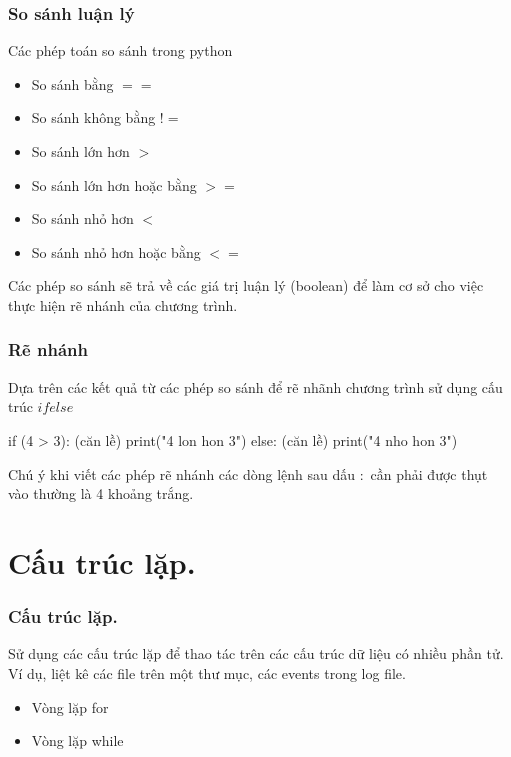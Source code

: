 \documentclass{beamer}
\begin{document}
\begin{frame}[label=sosanh]
\frametitle{So sánh luận lý}
Các phép toán so sánh trong python
\begin{itemize}
\item So sánh bằng $==$ 

\item So sánh không bằng $!=$
 
\item So sánh lớn hơn $>$

\item So sánh lớn hơn hoặc bằng $>=$

\item So sánh nhỏ hơn $<$

\item So sánh nhỏ hơn hoặc bằng $<=$
\end{itemize}

 Các phép so sánh sẽ trả về các giá trị luận lý (boolean) để làm cơ sở cho việc thực hiện rẽ nhánh của chương trình.

\hyperlink{luanly}{}
\end{frame}

\begin{frame}[label=renhanh]
\frametitle{Rẽ nhánh}
Dựa trên các kết quả từ các phép so sánh để rẽ nhãnh chương trình sử dụng cấu trúc $if else $

\begin{example}
if (4 > 3):\newline
(căn lề)	print("4 lon hon 3")\newline
else:\newline
(căn lề)	print("4 nho hon 3")\newline
\end{example}


 Chú ý khi viết các phép rẽ nhánh các dòng lệnh sau dấu $:$ cần phải được thụt vào thường là 4 khoảng trắng.

\hyperlink{luanly}{}
\end{frame}

\section{Cấu trúc lặp.}
\begin{frame}[label=vonglap]
\frametitle{Cấu trúc lặp.}

Sử dụng các cấu trúc lặp để thao tác trên các cấu trúc dữ liệu có nhiều phần tử. Ví dụ, liệt kê các file trên một thư mục, các events trong log file.
\begin{itemize}
\item Vòng lặp for \hyperlink{vongfor}{\beamerbutton{$\unrhd$}}
\item Vòng lặp while  \hyperlink{vongwhile}{\beamerbutton{$\unrhd$}}

\end{itemize}
\hyperlink{intro}{}
\hyperlink{ham}{}
\end{frame}
\end{document}

